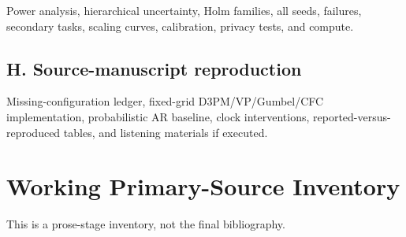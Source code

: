 \documentclass[11pt]{article}
\begin{document}
Power analysis, hierarchical uncertainty, Holm families, all seeds, failures, secondary tasks, scaling curves, calibration, privacy tests, and compute.

\subsection*{H. Source-manuscript reproduction}

Missing-configuration ledger, fixed-grid D3PM/\allowbreak{}VP/\allowbreak{}Gumbel/\allowbreak{}CFC implementation, probabilistic AR baseline, clock interventions, reported-versus-reproduced tables, and listening materials if executed.

\section*{Working Primary-Source Inventory}

This is a prose-stage inventory, not the final bibliography.
\end{document}
